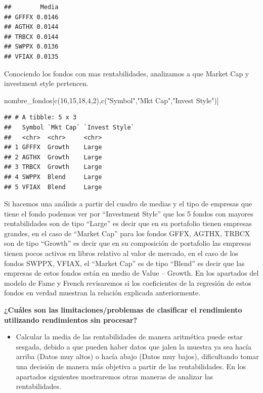 \documentclass[
  12pt,
]{article}
\newenvironment{Shaded}{\begin{snugshade}}{\end{snugshade}}
\newcommand{\DecValTok}[1]{\textcolor[rgb]{0.00,0.00,0.81}{#1}}
\newcommand{\FunctionTok}[1]{\textcolor[rgb]{0.00,0.00,0.00}{#1}}
\newcommand{\NormalTok}[1]{#1}
\newcommand{\StringTok}[1]{\textcolor[rgb]{0.31,0.60,0.02}{#1}}
\providecommand{\tightlist}{%
  \setlength{\itemsep}{0pt}\setlength{\parskip}{0pt}}
\begin{document}
\begin{verbatim}
##        Media
## GFFFX 0.0146
## AGTHX 0.0144
## TRBCX 0.0144
## SWPPX 0.0136
## VFIAX 0.0135
\end{verbatim}

Conociendo los fondos con mas rentabilidades, analizamos a que Market
Cap y investment style pertencen.

\begin{Shaded}
\begin{Highlighting}[]
\NormalTok{nombre\_fondos[}\FunctionTok{c}\NormalTok{(}\DecValTok{16}\NormalTok{,}\DecValTok{15}\NormalTok{,}\DecValTok{18}\NormalTok{,}\DecValTok{4}\NormalTok{,}\DecValTok{2}\NormalTok{),}\FunctionTok{c}\NormalTok{(}\StringTok{"Symbol"}\NormalTok{,}\StringTok{"Mkt Cap"}\NormalTok{,}\StringTok{"Invest Style"}\NormalTok{)]}
\end{Highlighting}
\end{Shaded}

\begin{verbatim}
## # A tibble: 5 x 3
##   Symbol `Mkt Cap` `Invest Style`
##   <chr>  <chr>     <chr>         
## 1 GFFFX  Growth    Large         
## 2 AGTHX  Growth    Large         
## 3 TRBCX  Growth    Large         
## 4 SWPPX  Blend     Large         
## 5 VFIAX  Blend     Large
\end{verbatim}

Si hacemos una análisis a partir del cuadro de medias y el tipo de
empresas que tiene el fondo podemos ver por ``Investment Style'' que los
5 fondos con mayores rentabilidades son de tipo ``Large'' es decir que
en su portafolio tienen empresas grandes, en el caso de ``Market Cap''
para los fondos GFFX, AGTHX, TRBCX son de tipo ``Growth'' es decir que
en su composición de portafolio las empresas tienen pocos activos en
libros relativo al valor de mercado, en el caso de los fondos SWPPX,
VFIAX, el ``Market Cap'' es de tipo ``Blend'' es decir que las empresas
de estos fondos están en medio de Value -- Growth. En los apartados del
modelo de Fame y French revisaremos si los coeficientes de la regresión
de estos fondos en verdad muestran la relación explicada anteriormente.

\textbf{¿Cuáles son las limitaciones/problemas de clasificar el
rendimiento utilizando rendimientos sin procesar?}

\begin{itemize}
\tightlist
\item
  Calcular la media de las rentabilidades de manera aritmética puede
  estar sesgada, debido a que pueden haber datos que jalen la muestra ya
  sea hacía arriba (Datos muy altos) o hacía abajo (Datos muy bajos),
  dificultando tomar una decisión de manera más objetiva a partir de las
  rentabilidades. En los apartados siguientes mostraremos otras maneras
  de analizar las rentabilidades.
\end{itemize}
\end{document}
